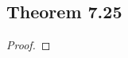 \documentclass[../../main.tex]{subfiles}
\begin{document}
\subsection{Theorem 7.25}
\begin{wts}

\end{wts}
\begin{proof}

\end{proof}
\end{document}
